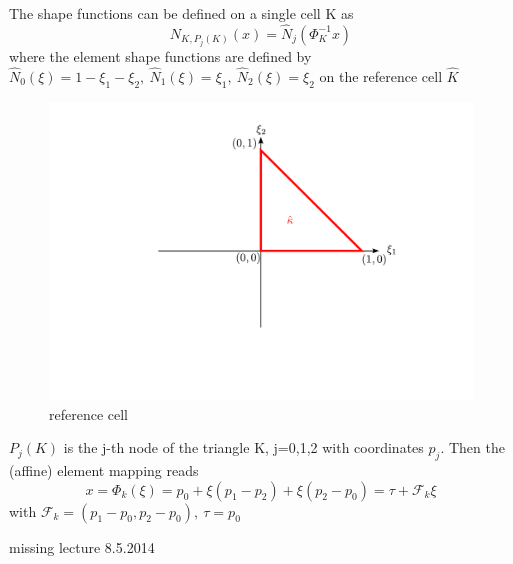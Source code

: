 \documentclass[english]{article}
\theoremstyle{definition}
\theoremstyle{remark}
\newcommand{\F}{\mathcal{F}}
\begin{document}
The shape functions can be defined on a single cell K as 
$$N_{K,P_j(K)}(x) = \hat N_j(\Phi^{-1}_K x)$$
where the element shape functions are defined by $\hat N_0(\xi ) = 1 - \xi_1-\xi_2, \ \hat N_1(\xi) =\xi_1 , \ \hat N_2(\xi) = \xi_2  $ on the reference cell $\hat K$\\
\begin{figure}[H]
  \begin{center}
    \includegraphics[width=\textwidth]{figs/referenceCellKappaHat.pdf}
  \end{center}
  \caption{reference cell}
  \label{ref-cell-kappa-hat-figure}
\end{figure}

$P_j(K) $ is the j-th node of the triangle K, j=0,1,2 with coordinates $p_j$. Then the (affine) element mapping reads 
$$x= \Phi_k(\xi) = p_0 + \xi(p_1-p_2)+\xi(p_2-p_0) = \tau + \F_k \xi$$
with $\F_k= (p_1-p_0,p_2-p_0) , \ \tau = p_0$
\printindex  %



missing lecture 8.5.2014
\end{document}
